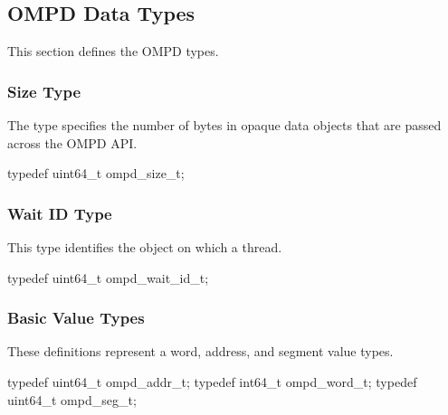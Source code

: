 
\subsection{OMPD Data Types}
\label{subsec:ompd-data-types}

This section defines the OMPD types.

\subsubsection{Size Type}
\label{subsubsubsec:ompd_size_t}

\summary
The  type specifies the number of bytes in opaque 
data objects that are passed across the OMPD API.

\format
\begin{ccppspecific}
\begin{ompSyntax}
typedef uint64_t ompd_size_t;
\end{ompSyntax}
\end{ccppspecific}



\subsubsection{Wait ID Type}
\label{subsubsubsec:ompd_wait_id_t}

\summary
This  type identifies the object on which a thread.

\format
\begin{ccppspecific}
\begin{ompSyntax}
typedef uint64_t ompd_wait_id_t;
\end{ompSyntax}
\end{ccppspecific}



\subsubsection{Basic Value Types}
\label{subsubsubsec:ompd_addr_t}
\label{subsubsubsec:ompd_word_t}
\label{subsubsubsec:ompd_seg_t}

\summary
These definitions represent a word, address, and segment value types.

\format

\begin{ccppspecific}
\begin{ompSyntax}
typedef uint64_t ompd_addr_t;
typedef int64_t  ompd_word_t;
typedef uint64_t ompd_seg_t;
\end{ompSyntax}
\end{ccppspecific}

